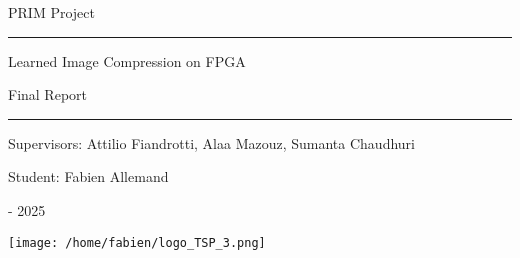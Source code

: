 \thispagestyle{empty}
\begin{center}

\vspace*{2.5cm}

{\fontsize{30}{30}\selectfont PRIM Project}

\rule{\textwidth}{1pt}

\medskip

{\fontsize{22}{22}\selectfont Learned Image Compression on FPGA}

{\fontsize{18}{18}\selectfont Final Report}

\rule{\textwidth}{1pt}

\medskip

{\fontsize{18}{18}\selectfont Supervisors: Attilio Fiandrotti, Alaa Mazouz, Sumanta Chaudhuri}

\medskip

{\fontsize{18}{18}\selectfont Student: Fabien Allemand}

\medskip

{\fontsize{14}{14} - 2025}

\vspace*{2.5cm}

\texttt{[image: /home/fabien/logo\_TSP\_3.png]}

\vfill

\end{center}